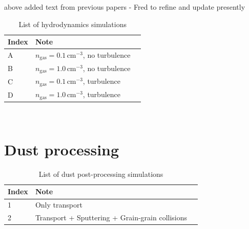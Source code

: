 \documentclass[fleqn,usenatbib]{mnras}
\newcommand{\fg}[1]{\textcolor{mypurple}{#1}}
\begin{document}
\fg{above added text from previous papers - Fred to refine and update presently}


 \begin{table}
 \centering
 \caption{List of hydrodynamics simulations}
 \begin{tabular}{ l l l}
 \hline\hline
 Index&Note&\\\hline 
 A&$n_\text{gas}=0.1\,\text{cm}^{-3}$, no turbulence&\\\hline  
 B&$n_\text{gas}=1.0\,\text{cm}^{-3}$, no turbulence&\\\hline   
 C&$n_\text{gas}=0.1\,\text{cm}^{-3}$, turbulence&\\\hline  
 D&$n_\text{gas}=1.0\,\text{cm}^{-3}$, turbulence&\\\hline   
 \end{tabular}
 \label{List_hydrosimulations}
 \end{table}

\newpage~
\newpage
\section{Dust processing}
 \begin{table}
 \centering
 \caption{List of dust post-processing simulations}
 \begin{tabular}{ l l l}
 \hline\hline
 Index&Note&\\\hline 
 1&Only transport&\\\hline  
 2&Transport + Sputtering + Grain-grain collisions&\\\hline 
 \end{tabular}
 \label{List_Dustsimulations}
 \end{table}
 
\end{document}
